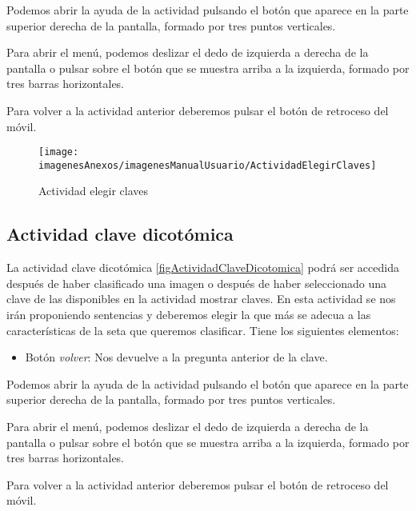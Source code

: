 Podemos abrir la ayuda de la actividad pulsando el botón que aparece en la parte superior derecha de la pantalla, formado por tres puntos verticales.

Para abrir el menú, podemos deslizar el dedo de izquierda a derecha de la pantalla o pulsar sobre el botón que se muestra arriba a la izquierda, formado por tres barras horizontales.

Para volver a la actividad anterior deberemos pulsar el botón de retroceso del móvil.

\begin{figure}[h]
    \begin{center}%
        \begin{center}%
          \texttt{[image: imagenesAnexos/imagenesManualUsuario/ActividadElegirClaves]}%
          \caption{Actividad elegir claves}%
          \label{figActividadElegirClaves}%
        \end{center}%
  	\end{center}%
\end{figure}%
\newpage

\subsection{Actividad clave dicotómica}

La actividad clave dicotómica \ref{figActividadClaveDicotomica} podrá ser accedida después de haber clasificado una imagen o después de haber seleccionado una clave de las disponibles en la actividad mostrar claves.
En esta actividad se nos irán proponiendo sentencias y deberemos elegir la que más se adecua a las características de la seta que queremos clasificar. Tiene los siguientes elementos:

\begin{itemize}
	\item Botón \textit{volver}: Nos devuelve a la pregunta anterior de la clave.
\end{itemize}

Podemos abrir la ayuda de la actividad pulsando el botón que aparece en la parte superior derecha de la pantalla, formado por tres puntos verticales.

Para abrir el menú, podemos deslizar el dedo de izquierda a derecha de la pantalla o pulsar sobre el botón que se muestra arriba a la izquierda, formado por tres barras horizontales.

Para volver a la actividad anterior deberemos pulsar el botón de retroceso del móvil.

